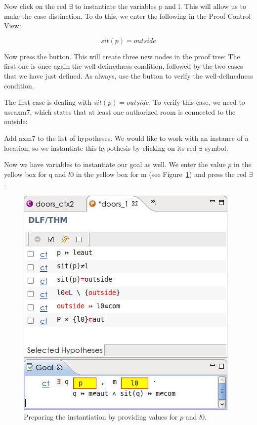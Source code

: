 Now click on the red $\exists$ to instantiate the variables p and l. This will allow us to make the case distinction. To do this, we enter the following in the Proof Control View:

$$ sit(p) = outside $$

Now press the  button.  This will create three new nodes in the proof tree: The first one is once again the well-definedness condition, followed by the two cases that we have just defined.  As always, use the  button to verify the well-definedness condition.

The first case is dealing with $sit(p) = outside$.  To verify this case, we need to use\textsf{axm7}, which states that at least one authorized room is connected to the outside:


Add \textsf{axm7} to the list of hypotheses.  We would like to work with an instance of a location, so we instantiate this hypothesis by clicking on its red $\exists$ symbol.


Now we have variables to instantiate our goal as well.  We enter the value $p$ in the yellow box for q and $l0$ in the yellow box for m (see Figure~\ref{tut_10_ref_proof2}) and press the red  $\exists$.

\begin{figure}[!ht]
\begin{center}
	\includegraphics[]{img/tutorial/tut_10_ref_proof2.png}
	\caption{Preparing the instantiation by providing values for $p$ and $l0$.}
	\label{tut_10_ref_proof2}
\end{center}
\end{figure}

